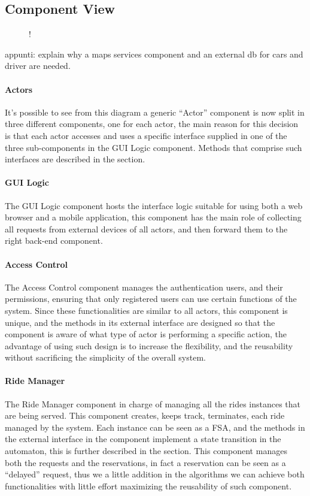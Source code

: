 \subsection{Component View}
\label{sec:component-view}
\begin{figure}[H]
	\centering
	\resizebox{6in}
	{!}{}
\end{figure}
appunti: explain why a maps services component and an external db for cars and driver are needed.
\paragraph{Actors}
It's possible to see from this diagram a generic ``Actor'' component is now split in three different components, one for each actor, the main reason for this decision is that each actor accesses and uses a specific interface supplied in one of the three sub-components in the GUI Logic component. Methods that comprise such interfaces are described in the  section.
\paragraph{GUI Logic}
The GUI Logic component hosts the interface logic suitable for using both a web browser and a mobile application, this component has the main role of collecting all requests from external devices of all actors, and then forward them to the right back-end component.
\paragraph{Access Control}
The Access Control component manages the authentication users, and their permissions, ensuring that only registered users can use certain functions of the system. \newline Since these functionalities are similar to all actors, this component is unique, and the methods in its external interface are designed so that the component is aware of what type of actor is performing a specific action, the advantage of using such design is to increase the flexibility, and the reusability without sacrificing the simplicity of the overall system.
\paragraph{Ride Manager}
The Ride Manager component in charge of managing all the rides instances that are being served. This component creates, keeps track, terminates, each ride managed by the system. Each instance can be seen as a FSA, and the methods in the external interface in the component implement a state transition in the automaton, this is further described in the  section. \newline
This component manages both the requests and the reservations, in fact a reservation can be seen as a ``delayed'' request, thus we a little addition in the algorithms we can achieve both functionalities with little effort maximizing the reusability of such component.
